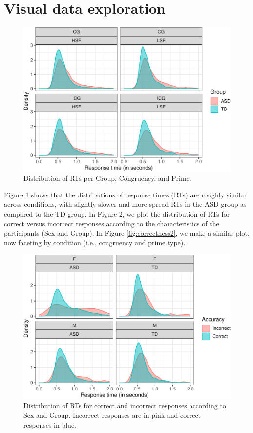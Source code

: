 \documentclass[
  11pt,
  english,
  ,doc,floatsintext]{apa6}
\begin{document}
\newpage

\hypertarget{visual-data-exploration}{%
\section{Visual data exploration}\label{visual-data-exploration}}

\begin{figure}[!htb]

{\centering \includegraphics[width=0.75\linewidth]{supplementary_materials_files/figure-latex/data-1} 

}

\caption{Distribution of RTs per Group, Congruency, and Prime.}\label{fig:data}
\end{figure}

Figure \ref{fig:data} shows that the distributions of response times (RTs) are roughly similar across conditions, with slightly slower and more spread RTs in the ASD group as compared to the TD group. In Figure \ref{fig:correctness1}, we plot the distribution of RTs for correct versus incorrect responses according to the characteristics of the participants (Sex and Group). In Figure \ref{fig:correctness2}, we make a similar plot, now faceting by condition (i.e., congruency and prime type).

\begin{figure}[!h]

{\centering \includegraphics[width=0.75\linewidth]{supplementary_materials_files/figure-latex/correctness1-1} 

}

\caption{Distribution of RTs for correct and incorrect responses according to Sex and Group. Incorrect responses are in pink and correct responses in blue.}\label{fig:correctness1}
\end{figure}
\end{document}
